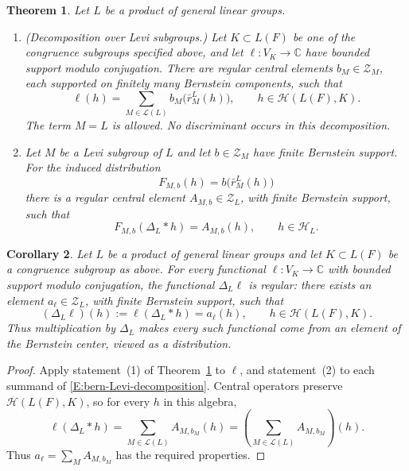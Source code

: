 \documentclass[11pt,a4paper]{amsart}
\newcommand{\mcH}{\mathcal H}
\newcommand{\mcZ}{\mathcal Z}
\newtheorem{theorem}{Theorem}[section]
\newtheorem{corollary}[theorem]{Corollary}
\theoremstyle{definition}
\theoremstyle{remark}
\begin{document}
\begin{theorem}\label{T:bern-main}
Let $L$ be a product of general linear groups.
\begin{enumerate}
\item\label{I:bern-decomposition}
\textup{(Decomposition over Levi subgroups.)}
Let $K\subset L(F)$ be one of the congruence subgroups specified above,
and let $\ell:V_K\to\mathbb C$ have bounded support modulo conjugation.
There are regular central elements
$b_M\in\mcZ_M$, each supported on finitely many Bernstein
components, such that
\begin{equation}\label{E:bern-Levi-decomposition}
 \ell(h)=\sum_{M\in\mathcal L(L)}
             b_M\bigl(\bar r_M^L(h)\bigr),
 \qquad h\in\mcH(L(F),K).
\end{equation}
The term $M=L$ is allowed. No discriminant occurs in this decomposition.

\item\label{I:bern-denominator}
Let $M$ be a Levi subgroup of $L$ and let
$b\in\mcZ_M$ have finite Bernstein support. For the induced
distribution
$$
 F_{M,b}(h)=b\bigl(\bar r_M^L(h)\bigr)
$$
there is a regular central element $A_{M,b}\in\mcZ_L$, with
finite Bernstein support, such that
\begin{equation}\label{E:bern-induced-denominator}
 F_{M,b}(\Delta_L* h)=A_{M,b}(h),
 \qquad h\in\mcH_L.
\end{equation}
\end{enumerate}
\end{theorem}

\begin{corollary}\label{C:bern-finite-level}
Let $L$ be a product of general linear groups and let
$K\subset L(F)$ be a congruence subgroup as above. For every functional
$\ell:V_K\to\mathbb C$ with bounded support modulo conjugation, the functional
$\Delta_L\ell$ is regular: there exists an element
$a_\ell\in\mcZ_L$, with finite Bernstein support, such that
\begin{equation}\label{E:bern-finite-level}
 (\Delta_L\ell)(h):=\ell(\Delta_L* h)
   =a_\ell(h),\qquad h\in\mcH(L(F),K).
\end{equation}
Thus multiplication by $\Delta_L$ makes every such functional come
from an element of the Bernstein center, viewed as a distribution.
\end{corollary}

\begin{proof}
Apply statement~(1) of Theorem~\ref{T:bern-main} to $\ell$, and statement~(2)
to each summand of \eqref{E:bern-Levi-decomposition}. Central operators
preserve $\mcH(L(F),K)$, so for every $h$ in this algebra,
$$
 \ell(\Delta_L* h)
 =\sum_{M\in\mathcal L(L)}A_{M,b_M}(h)
 =\left(\sum_{M\in\mathcal L(L)}A_{M,b_M}\right)(h).
$$
Thus $a_\ell=\sum_M A_{M,b_M}$ has the required properties.
\end{proof}
\end{document}
